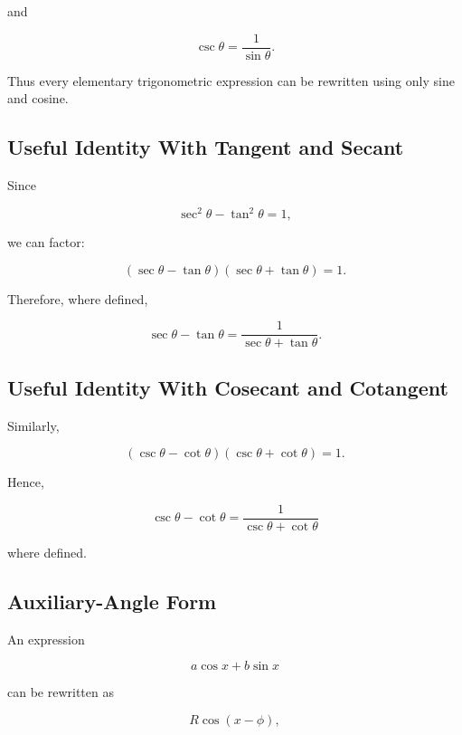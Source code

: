 and

\[
\boxed{
\csc\theta
=
\frac{1}{\sin\theta}.
}
\]

Thus every elementary trigonometric expression can be rewritten using only
sine and cosine.

\subsection{Useful Identity With Tangent and Secant}
\label{subsec:tangent-secant-factor-identity}

Since

\[
\sec^2\theta-\tan^2\theta=1,
\]

we can factor:

\[
\boxed{
(\sec\theta-\tan\theta)
(\sec\theta+\tan\theta)
=
1.
}
\]

Therefore, where defined,

\[
\boxed{
\sec\theta-\tan\theta
=
\frac{
1
}{
\sec\theta+\tan\theta
}.
}
\]

\subsection{Useful Identity With Cosecant and Cotangent}
\label{subsec:csc-cot-factor-identity}

Similarly,

\[
\boxed{
(\csc\theta-\cot\theta)
(\csc\theta+\cot\theta)
=
1.
}
\]

Hence,

\[
\boxed{
\csc\theta-\cot\theta
=
\frac{
1
}{
\csc\theta+\cot\theta
}
}
\]

where defined.

\subsection{Auxiliary-Angle Form}
\label{subsec:auxiliary-angle-reference}

An expression

\[
a\cos x+b\sin x
\]

can be rewritten as

\[
\boxed{
R\cos(x-\phi),
}
\]

